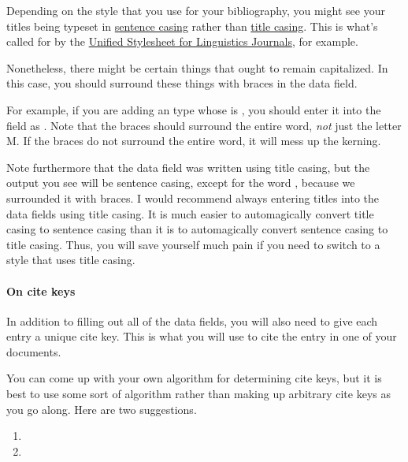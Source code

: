 Depending on the style that you use for your bibliography, you might see your titles being typeset in \href{https://en.wiktionary.org/wiki/sentence_case}{sentence casing} rather than \href{https://en.wiktionary.org/wiki/title_case}{title casing}.
This is what's called for by the \href{http://celxj.org/downloads/UnifiedStyleSheet.pdf}{Unified Stylesheet for Linguistics Journals}, for example.

Nonetheless, there might be certain things that ought to remain capitalized.
In this case, you should surround these things with braces in the data field.

For example, if you are adding an  type whose  is , you should enter it into the  field as .
Note that the braces should surround the entire word, \emph{not} just the letter M.
If the braces do not surround the entire word, it will mess up the kerning.

Note furthermore that the data field was written using title casing, but the output you see will be sentence casing, except for the word , because we surrounded it with braces.
I would recommend always entering titles into the data fields using title casing.
It is much easier to automagically convert title casing to sentence casing than it is to automagically convert sentence casing to title casing.
Thus, you will save yourself much pain if you need to switch to a style that uses title casing.

\paragraph{On cite keys}

In addition to filling out all of the data fields, you will also need to give each entry a unique cite key.
This is what you will use to cite the entry in one of your  documents.

You can come up with your own algorithm for determining cite keys, but it is best to use some sort of algorithm rather than making up arbitrary cite keys as you go along.
Here are two suggestions.

\begin{enumerate}[label={(\roman*)}]

	\item{}
	
	\item{}

\end{enumerate}

